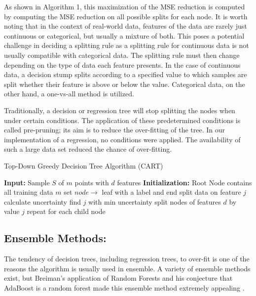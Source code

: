 \documentclass{article}
\begin{document}
As shown in Algorithm 1, this maximization of the MSE reduction is computed by computing the MSE reduction on all possible splits for each node. It is worth noting that in the context of real-world data, features of the data are rarely just continuous or categorical, but usually a mixture of both. This poses a potential challenge in deciding a splitting rule as a splitting rule for continuous data is not usually compatible with categorical data. The splitting rule must then change depending on the type of data each feature presents. In the case of continuous data, a decision stump splits according to a specified value to which samples are split whether their feature is above or below the value. Categorical data, on the other hand, a one-vs-all method is utilized.

Traditionally, a decision or regression tree will stop splitting the nodes when under certain conditions. The application of these predetermined conditions is called pre-pruning; its aim is to reduce the over-fitting of the tree. In our implementation of a regression, no conditions were applied. The availability of such a large data set reduced the chance of over-fitting.

\begin{algorithm}[ht]
\caption{Top-Down Greedy Decision Tree Algorithm (CART)}
\begin{algorithmic}[1]
\State \textbf{Input:} Sample $S$ of $m$ points with $d$ features
\State \textbf{Initialization:} Root Node contains all training data $m$
        \State set $node \to$ leaf with a label and end
    \EndIf
            \State split data on feature $j$
            \State calculate uncertainty
            \State find $j$ with min uncertainty
        \EndFor
    \EndFor
    \State split nodes of features $d$ by value $j$
    \State repeat for each child node
\EndProcedure
\end{algorithmic}
\end{algorithm}

\subsection{Ensemble Methods:}

The tendency of decision trees, including regression trees, to over-fit is one of the reasons the algorithm is usually used in ensemble. A variety of ensemble methods exist, but Breiman’s application of Random Forests and his conjecture that AdaBoost is a random forest made this ensemble method extremely appealing \cite{Breiman}.
\end{document}
